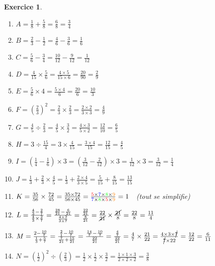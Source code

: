 \documentclass[10pt]{article}
\newtheorem{exo}{Exercice}
\begin{document}
\begin{exo}


\begin{multicols}{2}
\begin{enumerate}
\item $A=\frac{1}{8}+\frac{5}{8}=\frac{6}{8}=\frac{3}{4}$
\item $B=\frac{2}{3}-\frac{1}{2}=\frac{4}{6}-\frac{3}{6}=\frac{1}{6}$
\item $ C=\frac{5}{6}- \frac{3}{4}=\frac{10}{12}-\frac{9}{12}=\frac{1}{12}$
\item  $D=\frac{4}{15}\times \frac{5}{6}=\frac{4\times 5}{15\times 6}=\frac{20}{90}=\frac{2}{9}$
\item $E=\frac{5}{6}\times 4=\frac{5\times 4}{6}=\frac{20}{6}=\frac{10}{3}$
\item $ F=\left(\frac{2}{3}\right)^2=\frac{2}{3}\times \frac{2}{3}=\frac{2\times 2}{3\times 3}=\frac{4}{9}$
\item $ G=\frac{4}{5}\div\frac{2}{3}=\frac{4}{5}\times\frac{3}{2}=\frac{4\times 3}{5\times 2}=\frac{12}{10}=\frac{6}{5}$
\item $ H=3\div\frac{15}{4}=3\times\frac{4}{15}=\frac{3\times 4}{15}=\frac{12}{15}=\frac{4}{5}$
\item $I=\left(\frac{1}{4}-\frac{1}{6}\right)\times 3=\left(\frac{3}{12}-\frac{2}{12}\right)\times 3=\frac{1}{12}\times 3=\frac{3}{12}=\frac{1}{4}$
\item $ J=\frac{1}{3}+\frac{2}{3}\times\frac{4}{5}=\frac{1}{3}+\frac{2\times 4}{3\times 5}=\frac{5}{15}+\frac{8}{15}=\frac{13}{15}$
\item $ K=\frac{35}{56}\times\frac{72}{45}=\frac{35\times 72}{56\times 45}=\frac{\textcolor{red}{5}\times \textcolor{blue}{7}\times \textcolor{green}{8}\times \textcolor{orange}{9}}{ \textcolor{blue}{7}\times \textcolor{green}{8}\times \textcolor{red}{5}\times \textcolor{orange}{9}}=1~~$ (tout se simplifie)
\item $L=\frac{\frac{4}{3}-\frac{2}{7}}{\frac{4}{3}\times\frac{2}{7}}=\frac{\frac{28}{21}-\frac{6}{21}}{\frac{4\times 2}{3\times 7}}=\frac{\frac{22}{21}}{\frac{8}{21}}=\frac{22}{\cancel{21}}\times \frac{\cancel{21}}{8}=\frac{22}{8}=\frac{11}{4}
$
\item $ M=\frac{2-\frac{10}{7}}{\frac{1}{3}+\frac{5}{7}}=\frac{\frac{2}{1}-\frac{10}{7}}{\frac{7}{21}+\frac{15}{21}}=\frac{\frac{14}{7}-\frac{10}{7}}{\frac{22}{21}}
=\frac{\frac{4}{7}}{\frac{22}{21}}=\frac{4}{7}\times\frac{21}{22}=\frac{4\times 3\times \cancel{7}}{\cancel{7}\times 22}=\frac{12}{22}=\frac{6}{11}$
\item $ N=\left(\frac{1}{2}\right)^2\div\left(\frac{2}{3}\right)=\frac{1}{2}\times \frac{1}{2}\times \frac{3}{2}=\frac{1\times 1\times 3}{2\times 2\times 2}=\frac{3}{8}$

\end{enumerate}
\end{multicols}
\end{exo}
\end{document}

